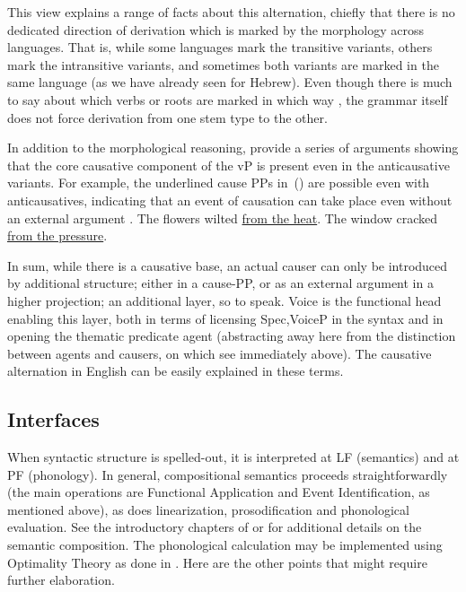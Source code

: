 This view explains a range of facts about this alternation, chiefly that there is no dedicated direction of derivation which is marked by the morphology across languages. That is, while some languages mark the transitive variants, others mark the intransitive variants, and sometimes both variants are marked in the same language (as we have already seen for Hebrew). Even though there is much to say about which verbs or roots are marked in which way \citep{haspelmath93,unaccusativity95,arad05}, the grammar itself does not force derivation from one stem type to the other.

In addition to the morphological reasoning, \cite{layering15} provide a series of arguments showing that the core causative component of the vP is present even in the anticausative variants. For example, the underlined cause PPs in~(\nextx) are possible even with anticausatives, indicating that an event of causation can take place even without an external argument \citep{alexiadouetal06,alexiadouetal06nels}.
\pex
	\a The flowers wilted \underline{from the heat}.
	\a The window cracked \underline{from the pressure}.
\xe

In sum, while there is a causative base, an actual causer can only be introduced by additional structure; either in a cause-PP, or as an external argument in a higher projection; an additional layer, so to speak. Voice is the functional head enabling this layer, both in terms of licensing Spec,VoiceP in the syntax and in opening the thematic predicate agent (abstracting away here from the distinction between agents and causers, on which see immediately above). The causative alternation in English can be easily explained in these terms.

	\subsection{Interfaces}
When syntactic structure is spelled-out, it is interpreted at LF (semantics) and at PF (phonology). In general, compositional semantics proceeds straightforwardly (the main operations are Functional Application and Event Identification, as mentioned above), as does linearization, prosodification and phonological evaluation. See the introductory chapters of \cite{wood15springer} or \cite{myler16mit} for additional details on the semantic composition. The phonological calculation may be implemented using Optimality Theory \citep{ot} as done in \cite{kastner18nllt}. Here are the other points that might require further elaboration.

